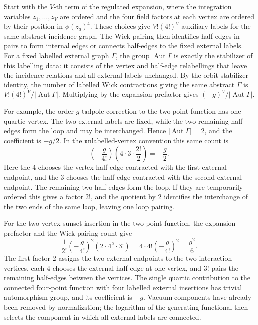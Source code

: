 Start with the \(V\)-th term of the regulated expansion, where the integration
variables \(z_1,\ldots,z_V\) are ordered and the four field factors at each
vertex are ordered by their position in \(\phi(z_a)^4\).  These choices give
\(V!(4!)^V\) auxiliary labels for the same abstract incidence graph.  The
Wick pairing then identifies half-edges in pairs to form internal edges or
connects half-edges to the fixed external labels.  For a fixed labelled
external graph \(\Gamma\), the group
\(\operatorname{Aut}\Gamma\) is exactly the stabilizer of this labelling data:
it consists of the vertex and half-edge relabellings that leave the incidence
relations and all external labels unchanged.  By the orbit-stabilizer
identity, the number of labelled Wick contractions giving the same abstract
\(\Gamma\) is \(V!(4!)^V/|\operatorname{Aut}\Gamma|\).  Multiplying by the
expansion prefactor gives \((-g)^V/|\operatorname{Aut}\Gamma|\).

For example, the order-\(g\) tadpole correction to the two-point function has
one quartic vertex. The two external labels are fixed, while the two remaining
half-edges form the loop and may be interchanged. Hence
\(|\operatorname{Aut}\Gamma|=2\), and the coefficient is \(-g/2\). In the
unlabelled-vertex convention this same count is
\[
  \left(-\frac{g}{4!}\right)
  \left(4\cdot3\cdot\frac{2!}{2}\right)
  =
  -\frac{g}{2}.
\]
Here the \(4\) chooses the vertex half-edge contracted with the first external
endpoint, and the \(3\) chooses the half-edge contracted with the second
external endpoint.  The remaining two half-edges form the loop.  If they are
temporarily ordered this gives a factor \(2!\), and the quotient by \(2\)
identifies the interchange of the two ends of the same loop, leaving one loop
pairing.

For the two-vertex sunset insertion in the two-point function, the expansion
prefactor and the Wick-pairing count give
\[
  \frac{1}{2!}
  \left(-\frac{g}{4!}\right)^2
  \left(2\cdot4^2\cdot3!\right)
  =
  4\cdot4!\left(-\frac{g}{4!}\right)^2
  =
  \frac{g^2}{6}.
\]
The first factor \(2\) assigns the two external endpoints to the two
interaction vertices, each \(4\) chooses the external half-edge at one vertex,
and \(3!\) pairs the remaining half-edges between the vertices. The single
quartic contribution to the connected four-point function with four labelled
external insertions has trivial automorphism group, and its coefficient is
\(-g\). Vacuum components have already been removed by normalization; the
logarithm of the generating functional then selects the component in which all
external labels are connected.

